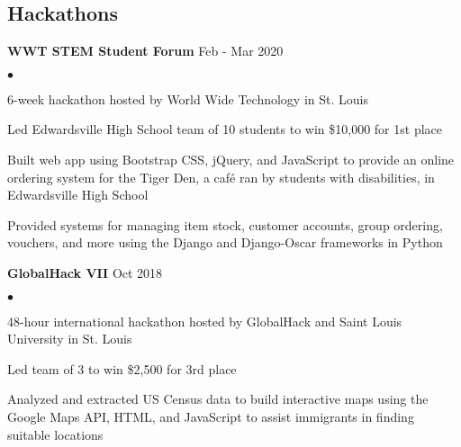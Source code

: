 \documentclass[margin,line]{res}
\newenvironment{list2}{
  \begin{list}{$\bullet$}{%
      \setlength{\itemsep}{0in}
      \setlength{\parsep}{0in} \setlength{\parskip}{0in}
      \setlength{\topsep}{0in} \setlength{\partopsep}{0in} 
      \setlength{\leftmargin}{0.2in}}}{\end{list}}
\begin{document}
\begin{resume}
  \section{\sc Hackathons}

  {\bf WWT STEM Student Forum} \hfill Feb - Mar 2020

  \begin{list2}
    \item 6-week hackathon hosted by World Wide Technology in St. Louis
    \item Led Edwardsville High School team of 10 students to win \$10,000 for 1st place
    \item Built web app using Bootstrap CSS, jQuery, and JavaScript to provide an online ordering system for the
    Tiger Den, a café ran by students with disabilities, in Edwardsville High School
    \item Provided systems for managing item stock, customer accounts, group ordering, vouchers, and more
    using the Django and Django-Oscar frameworks in Python
  \end{list2}
  
  {\bf GlobalHack VII} \hfill Oct 2018

  \begin{list2}
    \item 48-hour international hackathon hosted by GlobalHack and Saint Louis University in St. Louis
    \item Led team of 3 to win \$2,500 for 3rd place
    \item Analyzed and extracted US Census data to build interactive maps using the Google Maps API, HTML, and JavaScript to assist immigrants in finding suitable locations
  \end{list2}




\end{resume}
\end{document}
